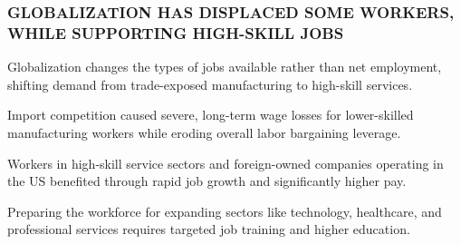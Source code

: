 \documentclass[10pt, aspectratio=169]{beamer}
\begin{document}
\begin{frame}[t]
    \frametitle{GLOBALIZATION HAS DISPLACED SOME WORKERS, WHILE SUPPORTING HIGH-SKILL JOBS}
    \vfill
    \begin{itemize}
        \setlength{\itemsep}{0.35cm}
        {\small
        \item Globalization changes the types of jobs available rather than net employment, shifting demand from trade-exposed manufacturing to high-skill services.
        \item Import competition caused severe, long-term wage losses for lower-skilled manufacturing workers while eroding overall labor bargaining leverage.
        \item Workers in high-skill service sectors and foreign-owned companies operating in the US benefited through rapid job growth and significantly higher pay.
        \item Preparing the workforce for expanding sectors like technology, healthcare, and professional services requires targeted job training and higher education.
        }
    \end{itemize}
    \vfill
\end{frame}
\end{document}

